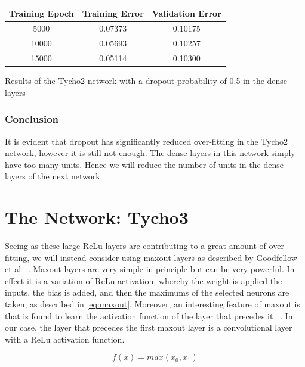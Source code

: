 \documentclass[12pt,a4paper,oneside,oldfontcommands]{memoir}
\begin{document}
\begin{Declaration Of OriginalityOrginality}
\begin{center} \label{tycho2-results-table}
 \begin{tabular}{||c | c | c||} 
 \hline
 Training Epoch & Training Error & Validation Error \\ [0.5ex] 
 \hline\hline
 5000 & 0.07373 & 0.10175\\ 
 \hline
 10000 & 0.05693 & 0.10257\\
 \hline
 15000 & 0.05114 & 0.10300\\
 \hline
\end{tabular}
\end{center}
\begin{center}
\bigskip
Results of the Tycho2 network with a dropout probability of 0.5 in the dense layers
\end{center}


\subsection{Conclusion}

It is evident that dropout has significantly reduced over-fitting in the Tycho2 network, however it is still not enough. The dense layers in this network simply have too many units. Hence we will reduce the number of units in the dense layers of the next network.

\chapter{The Network: Tycho3} \label{tycho3}


Seeing as these large ReLu layers are contributing to a great amount of over-fitting, we will instead consider using maxout layers as described by Goodfellow et al ~\cite{maxout}. Maxout layers are very simple in principle but can be very powerful. In effect it is a variation of ReLu activation, whereby the weight is applied the inputs, the bias is added, and then the maximums of the selected neurons are taken, as described in \ref{eq:maxout}. Moreover, an interesting feature of maxout is that is found to learn the activation function of the layer that precedes it ~\cite{maxout}. In our case, the layer that precedes the first maxout layer is a convolutional layer with a ReLu activation function. 

\begin{equation}
    f(x)=max(x_0, x_1)
    \label{eq:maxout}
\end{equation}


\end{Declaration Of OriginalityOrginality}
\end{document}
